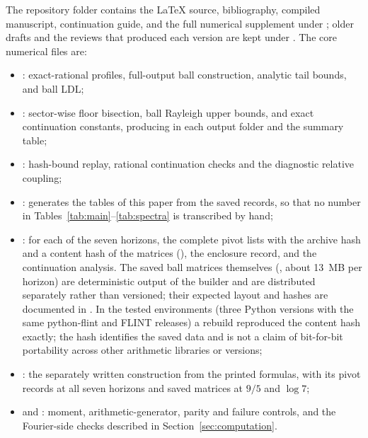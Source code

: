 \documentclass[11pt]{article}
\numberwithin{equation}{section}
\theoremstyle{definition}
\theoremstyle{remark}
\begin{document}
The repository folder  contains the LaTeX source,
bibliography, compiled manuscript, continuation guide, and the full numerical
supplement under ; older drafts and the reviews that produced
each version are kept under . The core numerical files are:
\begin{itemize}
\item {}: exact-rational profiles, full-output ball
  construction, analytic tail bounds, and ball LDL;
\item {}: sector-wise floor bisection, ball
  Rayleigh upper bounds, and exact continuation constants, producing
   in each output folder and the summary table;
\item {}: hash-bound replay, rational continuation
  checks and the diagnostic relative coupling;
\item {}: generates the tables of this paper from the
  saved records, so that no number in Tables~\ref{tab:main}--\ref{tab:spectra}
  is transcribed by hand;
\item {}: for each of the seven horizons, the
  complete pivot lists with the archive hash and a content hash of the matrices
  (), the enclosure record, and the continuation
  analysis. The saved ball matrices themselves (,
  about 13~MB per horizon) are deterministic output of the builder and are
  distributed separately rather than versioned; their expected layout and
  hashes are documented in . In the tested environments
  (three Python versions with the same python-flint and FLINT releases) a
  rebuild reproduced the content hash exactly; the hash identifies the saved
  data and is not a claim of bit-for-bit portability across other arithmetic
  libraries or versions;
\item {}: the separately written construction from
  the printed formulas, with its pivot records at all seven horizons and saved
  matrices at $9/5$ and $\log7$;
\item {} and : moment,
  arithmetic-generator, parity and failure controls, and the Fourier-side
  checks described in Section~\ref{sec:computation}.
\end{itemize}
\end{document}
